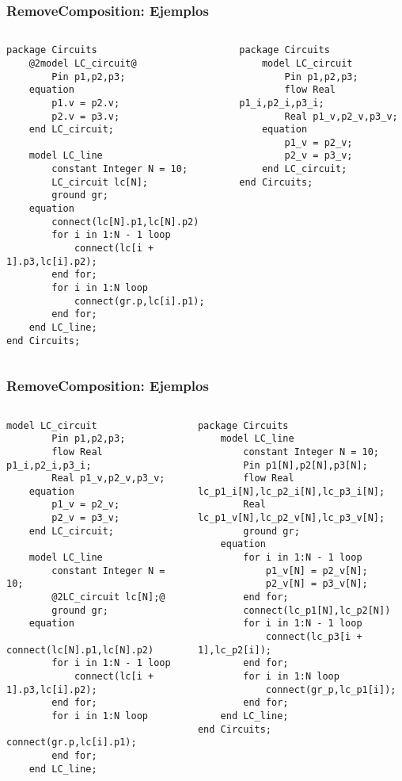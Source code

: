 \begin{frame}[fragile]
\frametitle{RemoveComposition: Ejemplos}
\begin{columns} 
\column[t]{7cm}  
\begin{lstlisting}[style=base,basicstyle=\scriptsize]
package Circuits
    @2model LC_circuit@
        Pin p1,p2,p3;
    equation
        p1.v = p2.v;
        p2.v = p3.v;
    end LC_circuit;
    
    model LC_line
        constant Integer N = 10;
        LC_circuit lc[N];
        ground gr;
    equation
        connect(lc[N].p1,lc[N].p2)      
        for i in 1:N - 1 loop
            connect(lc[i + 1].p3,lc[i].p2);
        end for;
        for i in 1:N loop
            connect(gr.p,lc[i].p1);
        end for;
    end LC_line;
end Circuits;
\end{lstlisting}

\column[t]{7cm}  
\begin{lstlisting}[style=base]
package Circuits
    model LC_circuit
        Pin p1,p2,p3;
        flow Real p1_i,p2_i,p3_i;
        Real p1_v,p2_v,p3_v;
    equation
        p1_v = p2_v;
        p2_v = p3_v;
    end LC_circuit;
end Circuits;
\end{lstlisting}
\end{columns}
\end{frame}

\begin{frame}[fragile]
\frametitle{RemoveComposition: Ejemplos}
\begin{columns} 
\column[t]{7cm}  
\begin{lstlisting}[style=base,basicstyle=\scriptsize]
    model LC_circuit
        Pin p1,p2,p3;
        flow Real p1_i,p2_i,p3_i;
        Real p1_v,p2_v,p3_v;
    equation
        p1_v = p2_v;
        p2_v = p3_v;
    end LC_circuit;
    
    model LC_line
        constant Integer N = 10;
        @2LC_circuit lc[N];@
        ground gr;
    equation
        connect(lc[N].p1,lc[N].p2)      
        for i in 1:N - 1 loop
            connect(lc[i + 1].p3,lc[i].p2);
        end for;
        for i in 1:N loop
            connect(gr.p,lc[i].p1);
        end for;
    end LC_line;
\end{lstlisting}

\column[t]{8cm}  
\begin{lstlisting}[style=base,basicstyle=\scriptsize]
package Circuits
    model LC_line
        constant Integer N = 10;
        Pin p1[N],p2[N],p3[N];
        flow Real lc_p1_i[N],lc_p2_i[N],lc_p3_i[N];
        Real lc_p1_v[N],lc_p2_v[N],lc_p3_v[N];
        ground gr;
    equation
        for i in 1:N - 1 loop
            p1_v[N] = p2_v[N];
            p2_v[N] = p3_v[N];
        end for;
        connect(lc_p1[N],lc_p2[N])      
        for i in 1:N - 1 loop
            connect(lc_p3[i + 1],lc_p2[i]);
        end for;
        for i in 1:N loop
            connect(gr_p,lc_p1[i]);
        end for;
    end LC_line;
end Circuits;
\end{lstlisting}
\end{columns}
\end{frame}


